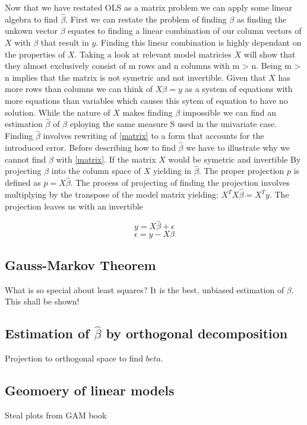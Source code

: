 \documentclass{article}
\begin{document}
    Now that we have restated OLS as a matrix problem we can apply some linear algebra to find $\widehat{\beta}$. First we can restate the problem of finding $\beta$ as finding the unkown vector $\beta$ equates to finding a linear combination of our column vectors of $X$ with $\beta$ that result in $y$. Finding this linear combination is highly dependant on the properties of $X$. Taking a look at relevant model matricies $X$ will show that they almost exclusively consist of m rows and n columns with m > n. Being m > n implies that the matrix is not symetric and not invertible. Given that $X$ has more rows than columns we can think of $X\beta = y$ as a system of equations with more equations than variables which causes this sytem of equation to have no solution. While the nature of $X$ makes finding $\beta$ impossible we can find an estimation $\widehat{\beta}$ of $\beta$ eploying the same measure S used in the univariate case. Finding $\widehat{\beta}$ involves rewriting of \ref{matrix} to a form that accounts for the introduced error. Before describing how to find $\widehat{\beta}$ we have to illustrate why we cannot find $\beta$ with \ref{matrix}. If the matrix $X$ would be symetric and invertible  By projecting $\beta$ into the column space of $X$ yielding in $\widehat{\beta}$. The proper projection $p$ is defined as $p = X\widehat{\beta}$. The process of projecting of finding the projection involves multiplying by the transpose of the model matrix yielding: $X^T X \widehat{\beta} = X^T y $. The projection leaves us with an invertible

    \begin{equation} y = X\widehat{\beta} + \epsilon  \end{equation}
    \begin{equation} \epsilon = y-X\beta \end{equation}




    \subsection{Gauss-Markov Theorem}
    What is so special about least squares? It is the best, unbiased estimation of $\beta$. This shall be shown!
    \subsection{Estimation of $\widehat{\beta}$ by orthogonal decomposition}
    Projection to orthogonal space to find $beta$.
    \subsection{Geomoery of linear models}
    Steal plots from GAM book
\end{document}
